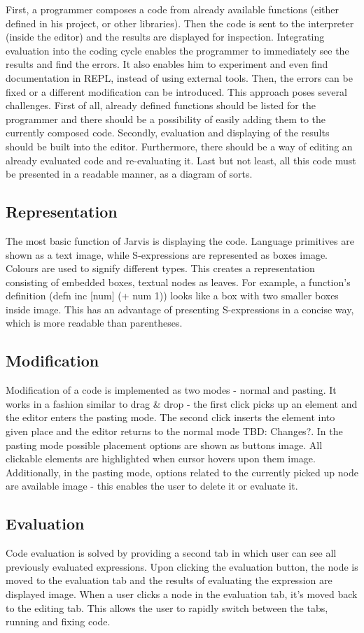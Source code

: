 \documentclass[11pt]{scrartcl}
\begin{document}
First, a programmer composes a code from already available functions (either defined in his project, or other libraries). Then the code is sent to the interpreter (inside the editor) and the results are displayed for inspection. Integrating evaluation into the coding cycle enables the programmer to immediately see the results and find the errors. It also enables him to experiment and even find documentation in REPL, instead of using external tools. Then, the errors can be fixed or a different modification can be introduced. This approach poses several challenges. First of all, already defined functions should be listed for the programmer and there should be a possibility of easily adding them to the currently composed code. Secondly, evaluation and displaying of the results should be built into the editor. Furthermore, there should be a way of editing an already evaluated code and re-evaluating it. Last but not least, all this code must be presented in a readable manner, as a diagram of sorts.
\subsection{Representation}
The most basic function of Jarvis is displaying the code. Language primitives are shown as a text {image}, while S-expressions are represented as boxes {image}. Colours are used to signify different types. This creates a representation consisting of embedded boxes, textual nodes as leaves. For example, a function’s definition (defn inc [num] (+ num 1)) looks like a box with two smaller boxes inside {image}. This has an advantage of presenting S-expressions in a concise way, which is more readable than parentheses.
\subsection{Modification}
Modification of a code is implemented as two modes - normal and pasting. It works in a fashion similar to drag \& drop - the first click picks up an element and the editor enters the pasting mode. The second click inserts the element into given place and the editor returns to the normal mode {TBD: Changes?}. In the pasting mode possible placement options are shown as buttons {image}. All clickable elements are highlighted when cursor hovers upon them {image}. Additionally, in the pasting mode, options related to the currently picked up node are available {image} - this enables the user to delete it or evaluate it.
\subsection{Evaluation}
Code evaluation is solved by providing a second tab in which user can see all previously evaluated expressions. Upon clicking the evaluation button, the node is moved to the evaluation tab and the results of evaluating the expression are displayed {image}. When a user clicks a node in the evaluation tab, it’s moved back to the editing tab. This allows the user to rapidly switch between the tabs, running and fixing code.
\end{document}
